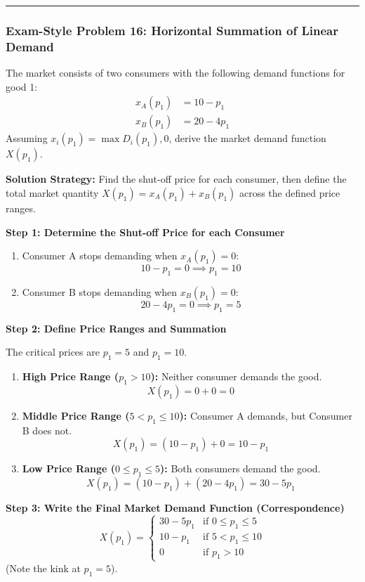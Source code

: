 \documentclass{article}
\begin{document}
\bigskip
\noindent\rule{\linewidth}{0.4pt}
\bigskip

\subsubsection*{Exam-Style Problem 16: Horizontal Summation of Linear Demand}

The market consists of two consumers with the following demand functions for good 1: 
\begin{align*}
x_A(p_1) &= 10 - p_1 \\
x_B(p_1) &= 20 - 4p_1
\end{align*}
Assuming $x_i(p_1) = \max{D_i(p_1), 0}$, derive the market demand function $X(p_1)$.

\textbf{Solution Strategy:} Find the shut-off price for each consumer, then define the total market quantity $X(p_1) = x_A(p_1) + x_B(p_1)$ across the defined price ranges.

\textbf{Step 1: Determine the Shut-off Price for each Consumer}
\begin{enumerate}
    \item Consumer A stops demanding when $x_A(p_1) = 0$: 
    \[ 10 - p_1 = 0 \implies p_1 = 10 \]
    \item Consumer B stops demanding when $x_B(p_1) = 0$: 
    \[ 20 - 4p_1 = 0 \implies p_1 = 5 \]
\end{enumerate}

\textbf{Step 2: Define Price Ranges and Summation} 

The critical prices are $p_1=5$ and $p_1=10$.
\begin{enumerate}
    \item \textbf{High Price Range ($p_1 > 10$):} Neither consumer demands the good. 
    \[ X(p_1) = 0 + 0 = 0 \]
    \item \textbf{Middle Price Range ($5 < p_1 \leq 10$):} Consumer A demands, but Consumer B does not. 
    \[ X(p_1) = (10 - p_1) + 0 = 10 - p_1 \]
    \item \textbf{Low Price Range ($0 \leq p_1 \leq 5$):} Both consumers demand the good. 
    \[ X(p_1) = (10 - p_1) + (20 - 4p_1) = 30 - 5p_1 \]
\end{enumerate}

\textbf{Step 3: Write the Final Market Demand Function (Correspondence)}
\[ X(p_1) = \begin{cases} 30 - 5p_1 & \text{if } 0 \leq p_1 \leq 5 \\ 10 - p_1 & \text{if } 5 < p_1 \leq 10 \\ 0 & \text{if } p_1 > 10 \end{cases} \]
(Note the kink at $p_1=5$).
\end{document}
